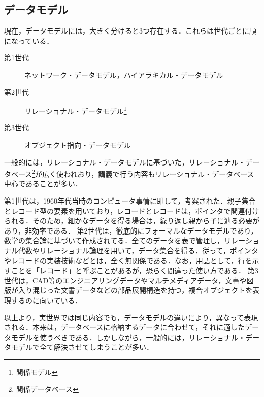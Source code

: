 \documentclass[a4paper,10pt]{jreport}
\begin{document}
\subsection{データモデル}
\par 現在，データモデルには，大きく分けると3つ存在する．これらは世代ごとに順になっている．
\begin{description}
	\item[第1世代] ネットワーク・データモデル，ハイアラキカル・データモデル
	\item[第2世代] リレーショナル・データモデル\footnote{関係モデル}
	\item[第3世代] オブジェクト指向・データモデル
\end{description}
一般的には，リレーショナル・データモデルに基づいた，リレーショナル・データベース\footnote{関係データベース}が広く使われおり，講義で行う内容もリレーショナル・データベース中心であることが多い．
\par 第1世代は，1960年代当時のコンピュータ事情に即して，考案された．親子集合とレコード型の要素を用いており，レコードとレコードは，ポインタで関連付けられる．そのため，細かなデータを得る場合は，繰り返し親から子に辿る必要があり，非効率である．
第2世代は，徹底的にフォーマルなデータモデルであり，数学の集合論に基づいて作成されてる．全てのデータを表で管理し，リレーショナル代数やリレーショナル論理を用いて，データ集合を得る．従って，ポインタやレコードの実装技術などとは，全く無関係である．なお，用語として，行を示すことを「レコード」と呼ぶことがあるが，恐らく間違った使い方である．
第3世代は，CAD等のエンジニアリングデータやマルチメディアデータ，文書や図版が入り混じった文書データなどの部品展開構造を持つ，複合オブジェクトを表現するのに向いている．
\par 以上より，実世界では同じ内容でも，データモデルの違いにより，異なって表現される．本来は，データベースに格納するデータに合わせて，それに適したデータモデルを使うべきである．しかしながら，一般的には，リレーショナル・データモデルで全て解決させてしまうことが多い．
\end{document}

